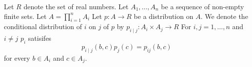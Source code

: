 

Let $R$ denote the set of
real numbers.
Let $A_1, \dots, A_n$ be
a sequence of non-empty finite
sets.
Let $A = \prod_{i = 1}^{n} A_i$
Let $p: A \to R$ be a distribution
on $A$.
We denote the conditional
distribution of $i$ on $j$ of
$p$ by $p_{i \mid j}: A_i \times A_j \to R$
For $i,j = 1, \dots, n$ and $i \neq j$
$p_i$ satisifes
\[
  p_{i \mid j}(b, c)p_{j}(c) = p_{ij}(b, c)
\]
for every $b \in A_i$ and $c \in A_j$.
\strats
